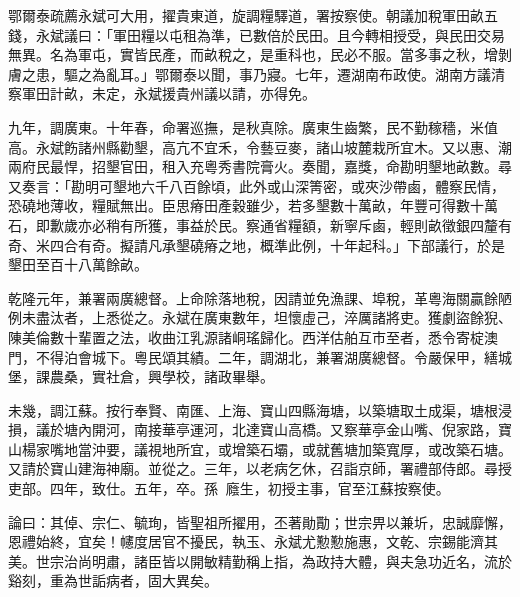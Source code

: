 \begin{pinyinscope}
鄂爾泰疏薦永斌可大用，擢貴東道，旋調糧驛道，署按察使。朝議加稅軍田畝五錢，永斌議曰：「軍田糧以屯租為準，已數倍於民田。且今轉相授受，與民田交易無異。名為軍屯，實皆民產，而畝稅之，是重科也，民必不服。當多事之秋，增剝膚之患，驅之為亂耳。」鄂爾泰以聞，事乃寢。七年，遷湖南布政使。湖南方議清察軍田計畝，未定，永斌援貴州議以請，亦得免。

九年，調廣東。十年春，命署巡撫，是秋真除。廣東生齒繁，民不勤稼穡，米值高。永斌飭諸州縣勸墾，高亢不宜禾，令藝豆麥，諸山坡麓栽所宜木。又以惠、潮兩府民最悍，招墾官田，租入充粵秀書院膏火。奏聞，嘉獎，命勘明墾地畝數。尋又奏言：「勘明可墾地六千八百餘頃，此外或山深箐密，或夾沙帶鹵，體察民情，恐磽地薄收，糧賦無出。臣思瘠田產穀雖少，若多墾數十萬畝，年豐可得數十萬石，即歉歲亦必稍有所獲，事益於民。察通省糧額，新寧斥鹵，輕則畝徵銀四釐有奇、米四合有奇。擬請凡承墾磽瘠之地，概準此例，十年起科。」下部議行，於是墾田至百十八萬餘畝。

乾隆元年，兼署兩廣總督。上命除落地稅，因請並免漁課、埠稅，革粵海關贏餘陋例未盡汰者，上悉從之。永斌在廣東數年，坦懷虛己，淬厲諸將吏。獲劇盜餘猊、陳美倫數十輩置之法，收曲江乳源諸峒瑤歸化。西洋估舶互市至者，悉令寄椗澳門，不得泊會城下。粵民頌其績。二年，調湖北，兼署湖廣總督。令嚴保甲，繕城堡，課農桑，實社倉，興學校，諸政畢舉。

未幾，調江蘇。按行奉賢、南匯、上海、寶山四縣海塘，以築塘取土成渠，塘根浸損，議於塘內開河，南接華亭運河，北達寶山高橋。又察華亭金山嘴、倪家路，寶山楊家嘴地當沖要，議視地所宜，或增築石壩，或就舊塘加築寬厚，或改築石塘。又請於寶山建海神廟。並從之。三年，以老病乞休，召詣京師，署禮部侍郎。尋授吏部。四年，致仕。五年，卒。孫，廕生，初授主事，官至江蘇按察使。

論曰：其倬、宗仁、毓珣，皆聖祖所擢用，丕著勛勩；世宗畀以兼圻，忠誠靡懈，恩禮始終，宜矣！幰度居官不擾民，執玉、永斌尤懃懃施惠，文乾、宗錫能濟其美。世宗治尚明肅，諸臣皆以開敏精勤稱上指，為政持大體，與夫急功近名，流於谿刻，重為世詬病者，固大異矣。


\end{pinyinscope}